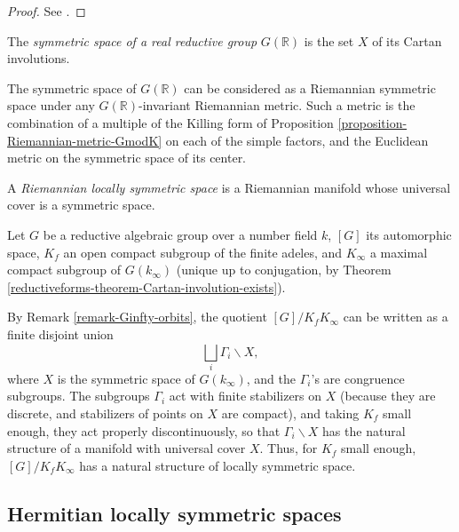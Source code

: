 \begin{proof}
See \cite[\S 5.4]{Paradan}.
\end{proof}



\begin{definition}
 \label{definition-symmetric-space-of-reductive-group}
The {\it symmetric space of a real reductive group} $G(\mathbb R)$ is the set $X$ of its Cartan involutions.
\end{definition}

The symmetric space of $G(\mathbb R)$ can be considered as a Riemannian symmetric space under any $G(\mathbb R)$-invariant Riemannian metric. Such a metric is the combination of a multiple of the Killing form of Proposition \ref{proposition-Riemannian-metric-GmodK} on each of the simple factors, and the Euclidean metric on the symmetric space of its center. 


\begin{definition}
 \label{definition-locally-symmetric-space}
A {\it Riemannian locally symmetric space} is a Riemannian manifold whose universal cover is a symmetric space.
\end{definition}


\begin{remark}
 \label{remark-locally-symmetric-of-G}
Let $G$ be a reductive algebraic group over a number field $k$, $[G]$ its automorphic space, $K_f$ an open compact subgroup of the finite adeles, and $K_\infty$ a maximal compact subgroup of $G(k_\infty)$ (unique up to conjugation, by Theorem \ref{reductiveforms-theorem-Cartan-involution-exists}). 

By Remark  \ref{remark-Ginfty-orbits}, the quotient $[G]/K_f K_\infty$ can be written as a finite disjoint union 
 $$ \bigsqcup_i \Gamma_i\backslash X,$$
 where $X$ is the symmetric space of $G(k_\infty)$, and the $\Gamma_i$'s are congruence subgroups. The subgroups $\Gamma_i$ act with finite stabilizers on $X$ (because they are discrete, and stabilizers of points on $X$ are compact), and taking $K_f$ small enough, they act properly discontinuously, so that $\Gamma_i\backslash X$ has the natural structure of a manifold with universal cover $X$. Thus, for $K_f$ small enough, $[G]/K_f K_\infty$ has a natural structure of locally symmetric space.
\end{remark}






\subsection{Hermitian locally symmetric spaces}
\label{subsection-hermitian-symmetric}

